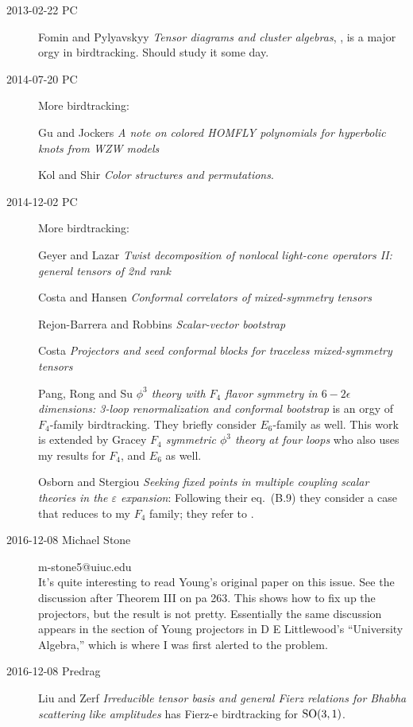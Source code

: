 \begin{description}
\item[2013-02-22 PC] Fomin and Pylyavskyy
{\em Tensor diagrams and cluster algebras}, {},
is a major orgy in birdtracking. Should study it some day.

\item[2014-07-20 PC] More birdtracking:

Gu and Jockers
 {\em A note on colored {HOMFLY} polynomials for hyperbolic knots
      from {WZW} models}

Kol and Shir {\em Color structures and permutations}.

\item[2014-12-02 PC] More birdtracking:

Geyer and Lazar
{\em Twist decomposition of nonlocal light-cone operators
{II:} general tensors of 2nd rank}

Costa and Hansen
{\em Conformal correlators of mixed-symmetry tensors}

Rejon-Barrera and Robbins {\em Scalar-vector bootstrap}

Costa \etal{}
{\em Projectors and seed conformal blocks for traceless mixed-symmetry tensors}

Pang, Rong  and Su {\em {$\phi^3$} theory with {$F_4$} flavor
symmetry in {$6-2\epsilon$} dimensions: 3-loop renormalization and conformal
bootstrap} is an orgy of $F_4$-family birdtracking. They briefly consider
$E_6$-family as well.
This work is extended by
Gracey {\em {$F_4$} symmetric {$\phi^3$} theory at four
loops} who also uses my results for $F_4$, and $E_6$ as well.

Osborn and Stergiou {\em Seeking fixed points in multiple
coupling scalar theories in the $\varepsilon$ expansion}:
Following their eq.~(B.9) they consider a case that reduces to my $F_4$
family; they refer to .

\item[2016-12-08 Michael Stone] m-stone5@uiuc.edu
\\
It's quite interesting to read Young's original paper on this
issue. See the discussion after Theorem III on pa 263. This shows how to fix
up the projectors, but the result is not pretty. Essentially the same
discussion appears in the section of Young projectors in D E Littlewood's
``University Algebra,'' which is where I was first alerted to the problem.

\item[2016-12-08 Predrag]
Liu and Zerf {\em Irreducible tensor basis and general {Fierz}
relations for {Bhabha} scattering like amplitudes} has Fierz-e birdtracking for
$\textrm{SO}(3,1)$.


\end{description}

